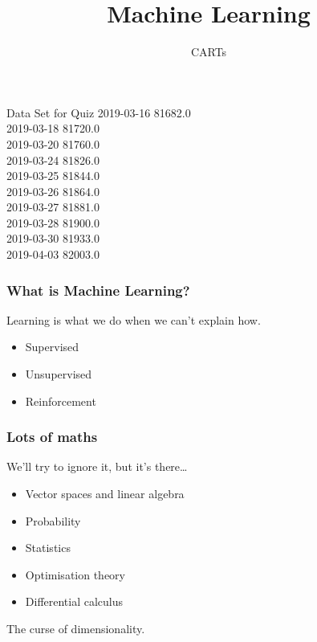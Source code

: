 
\title
{Machine Learning}
\subtitle{CARTs}



\begin{frame}{Data Set for Quiz}
  \vspace{1cm}
\vbox{
\hfil 2019-03-16 \hspace{5mm} 81682.0 \\
\hfil 2019-03-18 \hspace{5mm} 81720.0\\
\hfil 2019-03-20 \hspace{5mm} 81760.0\\
\hfil 2019-03-24 \hspace{5mm} 81826.0\\
\hfil 2019-03-25 \hspace{5mm} 81844.0\\
\hfil 2019-03-26 \hspace{5mm} 81864.0\\
\hfil 2019-03-27 \hspace{5mm} 81881.0\\
\hfil 2019-03-28 \hspace{5mm} 81900.0\\
\hfil 2019-03-30 \hspace{5mm} 81933.0\\
\hfil 2019-04-03 \hspace{5mm} 82003.0\\
}
\end{frame}


\begin{frame}
\end{frame}

\begin{frame}
  \frametitle{What is Machine Learning?}
  Learning is what we do when we can't explain how.
  \begin{itemize}
  \item Supervised
  \item Unsupervised
  \item Reinforcement
  \end{itemize}
\end{frame}

\begin{frame}
  \frametitle{Lots of maths}
  We'll try to ignore it, but it's there\dots
  \begin{itemize}
  \item Vector spaces and linear algebra
  \item Probability
  \item Statistics
  \item Optimisation theory
  \item Differential calculus
  \end{itemize}
  The curse of dimensionality.
\end{frame}

